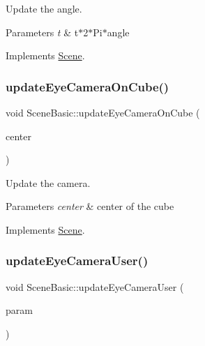 Update the angle. 


\begin{DoxyParams}{Parameters}
{\em t} & t$\ast$2$\ast$\+Pi$\ast$angle \\
\hline
\end{DoxyParams}


Implements \hyperlink{class_scene_aafa9ccf4d019005fdd41672afd13a7a9}{Scene}.

\hypertarget{class_scene_basic_a3fa1c3ba519581687c7fe7214af8cc58}{}\label{class_scene_basic_a3fa1c3ba519581687c7fe7214af8cc58} 
\subsubsection{\texorpdfstring{update\+Eye\+Camera\+On\+Cube()}{updateEyeCameraOnCube()}}
{\footnotesize\ttfamily void Scene\+Basic\+::update\+Eye\+Camera\+On\+Cube (\begin{DoxyParamCaption}\item[{std\+::vector$<$ double $>$}]{center }\end{DoxyParamCaption})\hspace{0.3cm}{\ttfamily [virtual]}}



Update the camera. 


\begin{DoxyParams}{Parameters}
{\em center} & center of the cube \\
\hline
\end{DoxyParams}


Implements \hyperlink{class_scene_a04ae3637cb26c4ad95004372d5a63654}{Scene}.

\hypertarget{class_scene_basic_abcd244d71f229f3d7c7133818c5e1898}{}\label{class_scene_basic_abcd244d71f229f3d7c7133818c5e1898} 
\subsubsection{\texorpdfstring{update\+Eye\+Camera\+User()}{updateEyeCameraUser()}}
{\footnotesize\ttfamily void Scene\+Basic\+::update\+Eye\+Camera\+User (\begin{DoxyParamCaption}\item[{\hyperlink{structset_of_view}{set\+Of\+View}}]{param }\end{DoxyParamCaption})\hspace{0.3cm}{\ttfamily [virtual]}}



